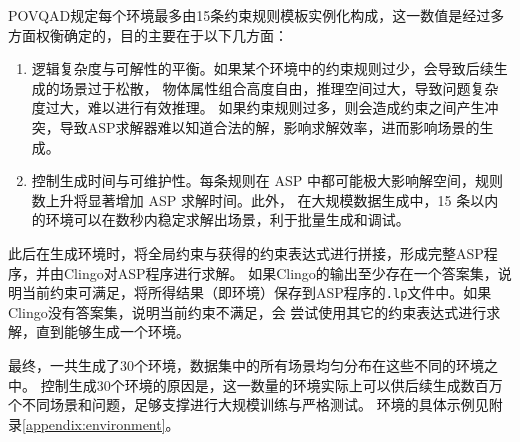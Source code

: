 POVQAD规定每个环境最多由15条约束规则模板实例化构成，这一数值是经过多方面权衡确定的，目的主要在于以下几方面：
\begin{enumerate}[nosep]
\item 逻辑复杂度与可解性的平衡。如果某个环境中的约束规则过少，会导致后续生成的场景过于松散，
物体属性组合高度自由，推理空间过大，导致问题复杂度过大，难以进行有效推理。
如果约束规则过多，则会造成约束之间产生冲突，导致ASP求解器难以知道合法的解，影响求解效率，进而影响场景的生成。
\item 控制生成时间与可维护性。每条规则在 ASP 中都可能极大影响解空间，规则数上升将显著增加 ASP 求解时间。此外，
在大规模数据生成中，15 条以内的环境可以在数秒内稳定求解出场景，利于批量生成和调试。
\end{enumerate}

此后在生成环境时，将全局约束与获得的约束表达式进行拼接，形成完整ASP程序，并由Clingo对ASP程序进行求解。
如果Clingo的输出至少存在一个答案集，说明当前约束可满足，将所得结果（即环境）保存到ASP程序的\texttt{.lp}文件中。如果Clingo没有答案集，说明当前约束不满足，会
尝试使用其它的约束表达式进行求解，直到能够生成一个环境。

最终，一共生成了30个环境，数据集中的所有场景均匀分布在这些不同的环境之中。
控制生成30个环境的原因是，这一数量的环境实际上可以供后续生成数百万个不同场景和问题，足够支撑进行大规模训练与严格测试。
环境的具体示例见附录\ref{appendix:environment}。
